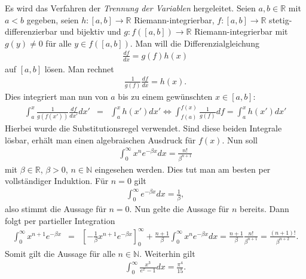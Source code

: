 \documentclass{book}
\begin{document}
Es wird das Verfahren der \textit{Trennung der Variablen} hergeleitet. Seien $a, b\in\mathbb{R}$ mit $a<b$ gegeben, seien $h:\left[a, b\right]\to\mathbb{R}$ Riemann-integrierbar, $f:\left[a, b\right]\to\mathbb{R}$ stetig-differenzierbar und bijektiv und $g:f\left(\left[a, b\right]\right)\to\mathbb{R}$ Riemann-integrierbar mit $g\left(y\right)\not = 0$ für alle $y\in f\left(\left[a, b\right]\right)$. Man will die Differenzialgleichung
%
\begin{eqnarray}
\frac{df}{dx} = g\left(f\right)h\left(x\right)
\end{eqnarray}
%
auf $\left[a, b\right]$ lösen. Man rechnet
%
\begin{eqnarray}
\frac{1}{g\left(f\right)}\frac{df}{dx} = h\left(x\right).
\end{eqnarray}
%
Dies integriert man nun von $a$ bis zu einem gewünschten $x\in\left[a, b\right]$:
%
\begin{eqnarray}
\int_{a}^x\frac{1}{g\left(f\left(x'\right)\right)}\frac{df}{dx'}dx' & = & \int_{a}^{x}h\left(x'\right)dx'\Leftrightarrow \int_{f\left(a\right)}^{f\left(x\right)}\frac{1}{g\left(f\right)}df = \int_{a}^{x}h\left(x'\right)dx'
\end{eqnarray}
%
Hierbei wurde die Substitutionsregel verwendet. Sind diese beiden Integrale lösbar, erhält man einen algebraischen Ausdruck für $f\left(x\right)$. Nun soll
%
\begin{eqnarray}
\int_{0}^{\infty}x^ne^{-\beta x}dx = \frac{n!}{\beta^{n + 1}}\label{eq:int_prop_1}
\end{eqnarray}
%
mit $\beta\in\mathbb{R}$, $\beta > 0$, $n\in\mathbb{N}$ eingesehen werden. Dies tut man am besten per vollständiger Induktion. Für $n = 0$ gilt
%
\begin{eqnarray}
\int_{0}^{\infty}e^{-\beta x}dx = \frac{1}{\beta}, 
\end{eqnarray}
%
also stimmt die Aussage für $n = 0$. Nun gelte die Aussage für $n$ bereits. Dann folgt per partieller Integration
%
\begin{eqnarray}
\int_{0}^{\infty}x^{n + 1}e^{-\beta x} & = & \left[-\frac{1}{\beta}x^{n + 1}e^{-\beta x}\right]_0^{\infty} + \frac{n + 1}{\beta}\int_{0}^{\infty}x^ne^{-\beta x}dx = \frac{n + 1}{\beta}\frac{n!}{\beta^{n + 1}} = \frac{\left(n + 1\right)!}{\beta^{n + 2}}.
\end{eqnarray}
%
Somit gilt die Aussage für alle $n\in\mathbb{N}$. Weiterhin gilt
%
\begin{eqnarray}
\int_{0}^{\infty}\frac{x^3}{e^x - 1}dx = \frac{\pi^4}{15}.\label{eq:stefanboltzmann_help}
\end{eqnarray}
\end{document}
